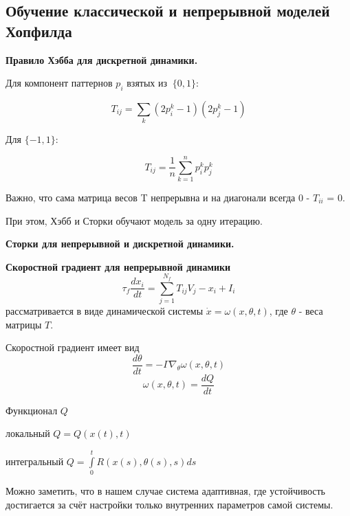 
\subsection{\texorpdfstring{\textbf{
      Обучение классической и непрерывной моделей Хопфилда}}
  {Обучение классической и непрерывной моделей Хопфилда}}

\textbf{Правило Хэбба для дискретной динамики.}

Для компонент паттернов \(p_{i}\) взятых из \(\ \{ 0,1\}\):


\[
  T_{ij} = \sum_{k}^{}{(2p_{i}^{k} - 1)(2p_{j}^{k} - 1)}
\]


Для \(\{ - 1,1\}\):


\[
  T_{ij} = \frac{1}{n}\sum_{k = 1}^{n}{p_{i}^{k}p_{j}^{k}}
\]


Важно, что сама матрица весов T непрерывна и
на диагонали всегда 0 - \(T_{ii}\) = 0.

При этом, Хэбб и Сторки обучают модель за одну итерацию.

\textbf{Сторки для непрерывной и дискретной динамики.}

\cite{storkey1997increasing}


\textbf{Скоростной градиент для непрерывной динамики}
\[
  \tau_f \frac{dx_i}{dt} =
  \sum\limits_{j=1}^{N_f} T_{ij} V_j - x_i + I_i
\]
рассматривается в виде динамической системы
\(\dot{x} = \omega(x,\theta,t)\), где \(\theta\) - веса матрицы
\(T\).

Скоростной градиент имеет вид
\[
  \frac{d\theta}{dt} = -\Gamma \nabla_{\theta}{\omega(x,\theta,t)}
\]
\[
  \omega(x,\theta,t) = \frac{dQ}{dt}
\]

Функционал \(Q\)

локальный \(Q = Q(x(t), t)\)

интегральный \(Q = \int\limits_0^t R(x(s),\theta(s),s) ds\) \cite{fradkov1990adaptive}

Можно заметить, что в нашем случае система адаптивная,
где устойчивость достигается за счёт настройки только
внутренних параметров самой системы.

